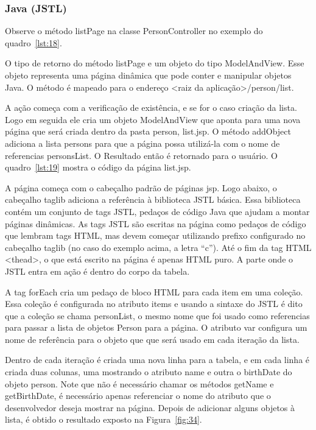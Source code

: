 \documentclass[a4paper,12pt]{article}
\newcommand{\javacode}[3] {
	
}
\newcommand{\jspcode}[3] {
	
}
\begin{document}
\subsubsection{Java (JSTL)}

Observe o método listPage na classe PersonController no exemplo do quadro~\ref{lst:18}.

\javacode{code/18.txt}{Ação no projeto Java que retorna uma página com a lista de Persons}{lst:18}

O tipo de retorno do método listPage e um objeto do tipo ModelAndView. Esse objeto representa uma página dinâmica que pode conter e manipular objetos Java. O método é mapeado para o endereço <raiz da aplicação>/person/list. 

A ação começa com a verificação de existência, e se for o caso criação da lista. Logo em seguida ele cria um objeto ModelAndView que aponta para uma nova página que será criada dentro da pasta person, list.jsp. O método addObject adiciona a lista persons para que a página possa utilizá-la com o nome de referencias personsList. O Resultado então é retornado para o usuário. O quadro~\ref{lst:19} mostra o código da página list.jsp.

\jspcode{code/19.txt}{Código da página list.jsp}{lst:19}

A página começa com o cabeçalho padrão de páginas jsp. Logo abaixo, o cabeçalho taglib adiciona a referência à biblioteca JSTL básica. Essa biblioteca contém um conjunto de tags JSTL, pedaços de código Java que ajudam a montar páginas dinâmicas. As tags JSTL são escritas na página como pedaços de código que lembram tags HTML, mas devem começar utilizando prefixo configurado no cabeçalho taglib (no caso do exemplo acima, a letra “c”). Até o fim da tag HTML <thead>, o que está escrito na página é apenas HTML puro. A parte onde o JSTL entra em ação é dentro do corpo da tabela. 

A tag forEach cria um pedaço de bloco HTML para cada item em uma coleção. Essa coleção é configurada no atributo items e usando a sintaxe do JSTL é dito que a coleção se chama personList, o mesmo nome que foi usado como referencias para passar a lista de objetos Person para a página. O atributo var configura um nome de referência para o objeto que que será usado em cada iteração da lista.

Dentro de cada iteração é criada uma nova linha para a tabela, e em cada linha é criada duas colunas, uma mostrando o atributo name e outra o birthDate do objeto person. Note que não é necessário chamar os métodos getName e getBirthDate, é necessário apenas referenciar o nome do atributo que o desenvolvedor deseja mostrar na página. Depois de adicionar alguns objetos à lista, é obtido o resultado exposto na Figura~\ref{fig:34}.
\end{document}
